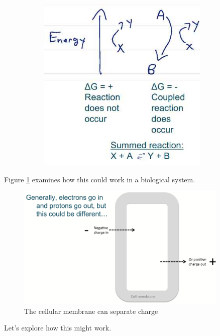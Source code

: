 \documentclass[]{article}
\begin{document}
\begin{figure}[H]
\begin{subfigure}[t]{0.3\textwidth}
		\includegraphics[width=0.9\textwidth]{CoupledReactions}
	\end{subfigure}
\end{figure}

Figure \ref{fig:EnergyHarvesting1} examines how this could work in a biological system.

\begin{figure}[H]
	\caption{The cellular membrane 	can separate charge} \label{fig:EnergyHarvesting1} 
	\includegraphics[width=0.9\textwidth]{EnergyHarvesting1}
\end{figure}

Let's explore how this might work. 
\end{document}
